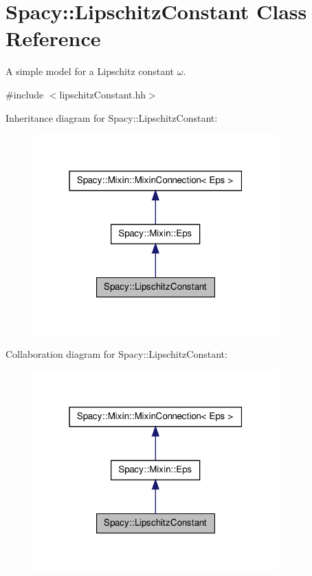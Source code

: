 \hypertarget{classSpacy_1_1LipschitzConstant}{\section{\-Spacy\-:\-:\-Lipschitz\-Constant \-Class \-Reference}
\label{classSpacy_1_1LipschitzConstant}
}


\-A simple model for a \-Lipschitz constant $\omega$.  




{\ttfamily \#include $<$lipschitz\-Constant.\-hh$>$}



\-Inheritance diagram for \-Spacy\-:\-:\-Lipschitz\-Constant\-:
\nopagebreak
\begin{figure}[H]
\begin{center}
\leavevmode
\includegraphics[width=268pt]{classSpacy_1_1LipschitzConstant__inherit__graph}
\end{center}
\end{figure}


\-Collaboration diagram for \-Spacy\-:\-:\-Lipschitz\-Constant\-:
\nopagebreak
\begin{figure}[H]
\begin{center}
\leavevmode
\includegraphics[width=268pt]{classSpacy_1_1LipschitzConstant__coll__graph}
\end{center}
\end{figure}
